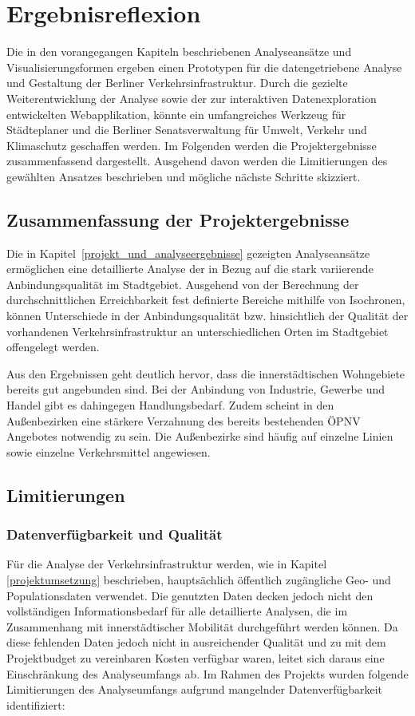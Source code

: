 \newpage

\section{Ergebnisreflexion}
\label{ergebnisreflexion}

Die in den vorangegangen Kapiteln beschriebenen Analyseansätze und Visualisierungsformen ergeben einen Prototypen für die datengetriebene Analyse und Gestaltung der Berliner Verkehrsinfrastruktur. Durch die gezielte Weiterentwicklung der Analyse sowie der zur interaktiven Datenexploration entwickelten Webapplikation, könnte ein umfangreiches Werkzeug für Städteplaner und die Berliner Senatsverwaltung für Umwelt, Verkehr und Klimaschutz geschaffen werden. Im Folgenden werden die Projektergebnisse zusammenfassend dargestellt. Ausgehend davon werden die Limitierungen des gewählten Ansatzes beschrieben und mögliche nächste Schritte skizziert.

\subsection{Zusammenfassung der Projektergebnisse}
Die in Kapitel~\ref{projekt_und_analyseergebnisse} gezeigten Analyseansätze ermöglichen eine detaillierte Analyse der in Bezug auf die stark variierende Anbindungsqualität im Stadtgebiet. Ausgehend von der Berechnung der durchschnittlichen Erreichbarkeit fest definierte Bereiche mithilfe von Isochronen, können Unterschiede in der Anbindungsqualität bzw. hinsichtlich der Qualität der vorhandenen Verkehrsinfrastruktur an unterschiedlichen Orten im Stadtgebiet offengelegt werden.

Aus den Ergebnissen geht deutlich hervor, dass die innerstädtischen Wohngebiete bereits gut angebunden sind. Bei der Anbindung von Industrie, Gewerbe und Handel gibt es dahingegen Handlungsbedarf. Zudem scheint in den Außenbezirken eine stärkere Verzahnung des bereits bestehenden ÖPNV Angebotes notwendig zu sein. Die Außenbezirke sind häufig auf einzelne Linien sowie einzelne Verkehrsmittel angewiesen.

\subsection{Limitierungen}\label{limitierung}
\subsubsection{Datenverfügbarkeit und Qualität}
Für die Analyse der Verkehrsinfrastruktur werden, wie in Kapitel \ref{projektumsetzung} beschrieben, hauptsächlich öffentlich zugängliche Geo- und Populationsdaten verwendet. Die genutzten Daten decken jedoch nicht den vollständigen Informationsbedarf für alle detaillierte Analysen, die im Zusammenhang mit innerstädtischer Mobilität durchgeführt werden können. Da diese fehlenden Daten jedoch nicht in ausreichender Qualität und zu mit dem Projektbudget zu vereinbaren Kosten verfügbar waren, leitet sich daraus eine Einschränkung des Analyseumfangs ab. Im Rahmen des Projekts wurden folgende Limitierungen des Analyseumfangs aufgrund mangelnder Datenverfügbarkeit identifiziert:

